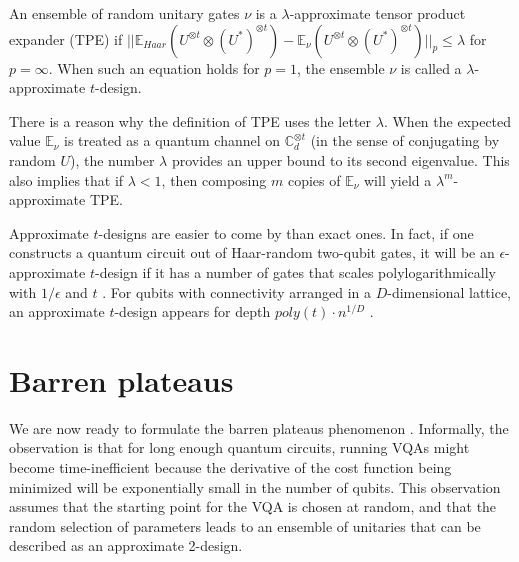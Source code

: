 \begin{definition}
    An ensemble of random unitary gates $\nu$ is a $\lambda$-approximate tensor product expander (TPE) if $||\mathbb{E}_{Haar} (U^{\otimes t} \otimes (U^*)^{\otimes t}) - \mathbb{E}_\nu (U^{\otimes t} \otimes (U^*)^{\otimes t}) ||_p \leq \lambda$ for $p=\infty$. When such an equation holds for $p=1$, the ensemble $\nu$ is called a $\lambda$-approximate $t$-design.
\end{definition}


\begin{remark}
    There is a reason why the definition of TPE uses the letter $\lambda$. When the expected value $\mathbb{E}_\nu$ is treated as a quantum channel on $\mathbb{C}_d^{\otimes t}$ (in the sense of conjugating by random $U$), the number $\lambda$ provides an upper bound to its second eigenvalue. This also implies that if $\lambda < 1$, then composing $m$ copies of $\mathbb{E}_\nu$ will yield a $\lambda^m$-approximate TPE.
\end{remark}

Approximate $t$-designs are easier to come by than exact ones. In fact, if one constructs a quantum circuit out of Haar-random two-qubit gates, it will be an $\epsilon$-approximate $t$-design if it has a number of gates that scales polylogarithmically with $1/\epsilon$ and $t$ \cite{brandao_local_2016}. For qubits with connectivity arranged in a $D$-dimensional lattice, an approximate $t$-design appears for depth $poly(t) \cdot n^{1/D}$ \cite{harrow_approximate_2018}.

\section{Barren plateaus}

We are now ready to formulate the barren plateaus phenomenon \cite{mcclean_barren_2018}. Informally, the observation is that for long enough quantum circuits, running VQAs might become time-inefficient because the derivative of the cost function being minimized will be exponentially small in the number of qubits. This observation assumes that the starting point for the VQA is chosen at random, and that the random selection of parameters leads to an ensemble of unitaries that can be described as an approximate 2-design.

